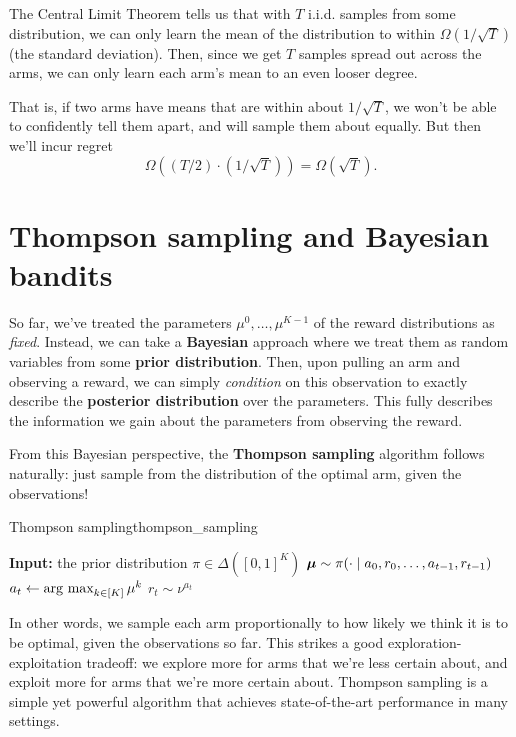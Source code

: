 \documentclass[\main/main]{subfiles}
\begin{document}
The Central Limit Theorem tells us that with $T$ i.i.d. samples from some distribution, we can only learn the mean of the distribution to within $\Omega(1/\sqrt{T})$ (the standard deviation). Then, since we get $T$ samples spread out across the arms, we can only learn each arm's mean to an even looser degree.

That is, if two arms have means that are within about $1/\sqrt{T}$, we won't be able to confidently tell them apart, and will sample them about equally. But then we'll incur regret \[ \Omega((T/2) \cdot (1/\sqrt{T})) = \Omega(\sqrt{T}). \]


\section{Thompson sampling and Bayesian bandits}

So far, we've treated the parameters $\mu^0, \dots, \mu^{K-1}$ of the reward distributions as \emph{fixed}. Instead, we can take a \textbf{Bayesian} approach where we treat them as random variables from some \textbf{prior distribution}. Then, upon pulling an arm and observing a reward, we can simply \emph{condition} on this observation to exactly describe the \textbf{posterior distribution} over the parameters. This fully describes the information we gain about the parameters from observing the reward.

From this Bayesian perspective, the \textbf{Thompson sampling} algorithm follows naturally: just sample from the distribution of the optimal arm, given the observations!
\begin{definition}{Thompson sampling}{thompson_sampling}
    \begin{algorithmic}
        \State \textbf{Input:} the prior distribution $\pi \in \Delta([0, 1]^K)$
        \State $\boldsymbol{\mu} \sim \pi(\cdot \mid a_0, r_0, \dots, a_{t-1}, r_{t-1})$
        \State $a_t \gets \operatorname*{\textrm{arg\ max}}_{k \in [K]} \mu^k$
        \State $r_t \sim \nu^{a_t}$
        \EndFor
    \end{algorithmic}
\end{definition}
In other words, we sample each arm proportionally to how likely we think it is to be optimal, given the observations so far.
This strikes a good exploration-exploitation tradeoff: we explore more for arms that we're less certain about, and exploit more for arms that we're more certain about.
Thompson sampling is a simple yet powerful algorithm that achieves state-of-the-art performance in many settings.
\end{document}
